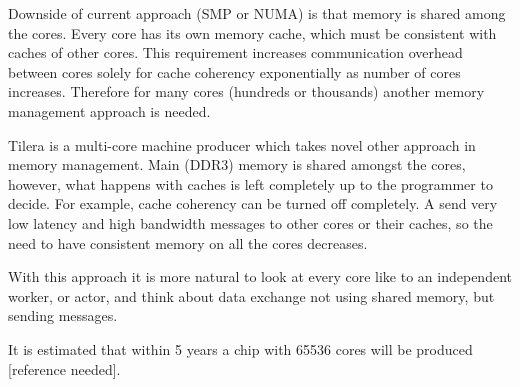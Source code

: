 \documentclass[english,11pt]{article}
\numberwithin{equation}{section}
\begin{document}
Downside of current approach (SMP or NUMA) is that memory is shared among the
cores. Every core has its own memory cache, which must be consistent with
caches of other cores. This requirement increases communication overhead
between cores solely for cache coherency exponentially as number of cores
increases. Therefore for many cores (hundreds or thousands) another memory
management approach is needed.

Tilera is a multi-core machine producer which takes novel other approach in
memory management. Main (DDR3) memory is shared amongst the cores, however,
what happens with caches is left completely up to the programmer to decide.
For example, cache coherency can be turned off completely. A send very low
latency and high bandwidth messages to other cores or their caches, so
the need to have consistent memory on all the cores decreases.

With this approach it is more natural to look at every core like to an
independent worker, or actor, and think about data exchange not using shared
memory, but sending messages.

It is estimated that within 5 years a chip with 65536 cores will be produced
[reference needed].
\end{document}
